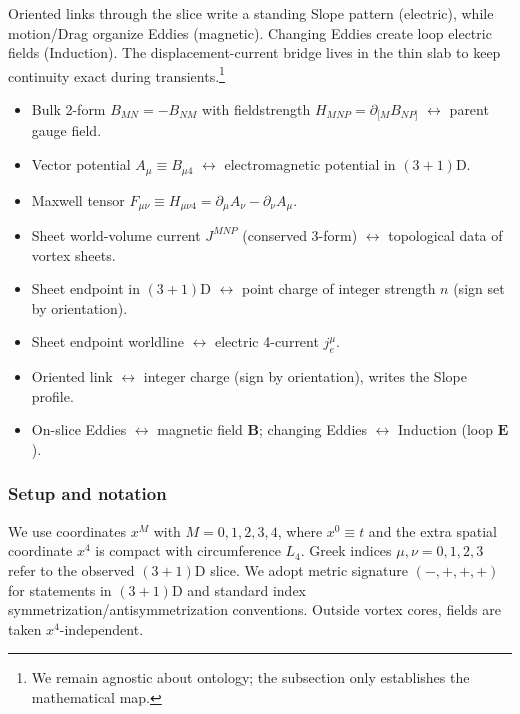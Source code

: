 \begin{tcolorbox}[title=Plain-language snapshot (30 seconds)]
Oriented links through the slice write a standing Slope pattern (electric), while motion/Drag organize Eddies (magnetic). Changing Eddies create loop electric fields (Induction). The displacement-current bridge lives in the thin slab to keep continuity exact during transients.\footnote{We remain agnostic about ontology; the subsection only establishes the mathematical map.}
\end{tcolorbox}

\begin{tcolorbox}[title=Quick dictionary (objects \(\leftrightarrow\) meanings)]
\begin{itemize}
  \item Bulk 2-form \(B_{MN}=-B_{NM}\) with fieldstrength \(H_{MNP}=\partial_{[M}B_{NP]}\) $\leftrightarrow$ parent gauge field.
  \item Vector potential \(A_\mu\equiv B_{\mu 4}\) $\leftrightarrow$ electromagnetic potential in $(3{+}1)$D.
  \item Maxwell tensor \(F_{\mu\nu}\equiv H_{\mu\nu 4}=\partial_\mu A_\nu-\partial_\nu A_\mu\).
  \item Sheet world-volume current \(J^{MNP}\) (conserved 3-form) $\leftrightarrow$ topological data of vortex sheets.
  \item Sheet endpoint in $(3{+}1)$D $\leftrightarrow$ point charge of integer strength \(n\) (sign set by orientation).
  \item Sheet endpoint worldline $\leftrightarrow$ electric 4-current \(j_e^\mu\).
  \item Oriented link $\leftrightarrow$ integer charge (sign by orientation), writes the Slope profile.
  \item On-slice Eddies $\leftrightarrow$ magnetic field $\mathbf B$; changing Eddies $\leftrightarrow$ Induction (loop $\mathbf E$).
\end{itemize}
\end{tcolorbox}

\subsubsection{Setup and notation}
We use coordinates $x^M$ with $M=0,1,2,3,4$, where $x^0\equiv t$ and the extra spatial coordinate $x^4$ is compact with circumference $L_4$. Greek indices $\mu,\nu=0,1,2,3$ refer to the observed $(3{+}1)$D slice. We adopt metric signature $(-,+,+,+)$ for statements in $(3{+}1)$D and standard index symmetrization/antisymmetrization conventions. Outside vortex cores, fields are taken $x^4$-independent.

